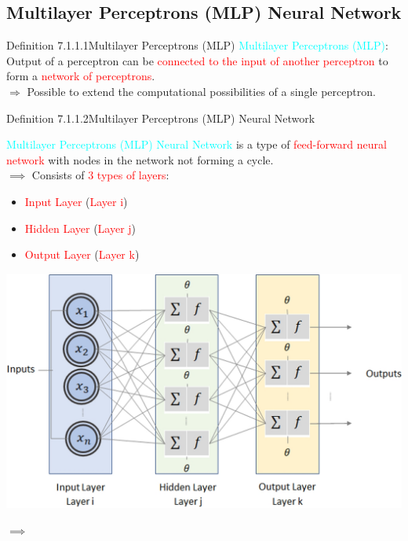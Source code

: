 \documentclass{book}
\begin{document}
\subsection{Multilayer Perceptrons (MLP) Neural Network}
\begin{defBox}{Definition 7.1.1.1}{Multilayer Perceptrons (MLP)}
    \textcolor{cyan}{Multilayer Perceptrons (MLP)}: Output of a perceptron can be \textcolor{red}{connected to the input of another perceptron} to form a \textcolor{red}{network of perceptrons}.\\
    $\Rightarrow$ Possible to extend the computational possibilities of a single perceptron.
\end{defBox}
\begin{defBox}{Definition 7.1.1.2}{Multilayer Perceptrons (MLP) Neural Network}
    \raggedright
    \textcolor{cyan}{Multilayer Perceptrons (MLP) Neural Network} is a type of \textcolor{red}{feed-forward neural network} with nodes in the network not forming a cycle.\\
    $\implies$ Consists of \textcolor{red}{3 types of layers}:
    \begin{itemize}
        \item \textcolor{red}{Input Layer} (\textcolor{red}{Layer i})
        \item \textcolor{red}{Hidden Layer} (\textcolor{red}{Layer j})
        \item \textcolor{red}{Output Layer} (\textcolor{red}{Layer k})
    \end{itemize}
    \begin{center}
        \includegraphics[scale=0.18]{chapter 7/ch7_figure1.jpeg}
    \end{center}
    $\implies$ \\

\end{defBox}
\end{document}
